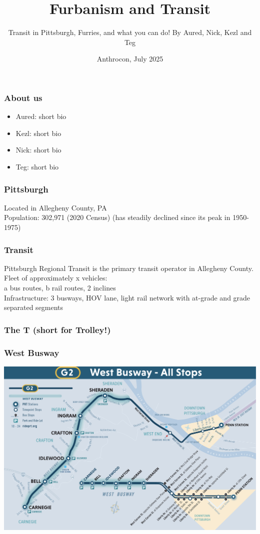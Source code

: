 \documentclass{beamer}
\title{Furbanism and Transit}
\subtitle{Transit in Pittsburgh, Furries, and what you can do! By Aured, Nick, Kezl and Teg}
\date[Anthrocon 2025]{Anthrocon, July 2025}
\begin{document}
\frame{\titlepage}

\begin{frame}
\frametitle{About us}
\begin{itemize}
    \item Aured: short bio %
    \item Kezl: short bio %
    \item Nick: short bio %
    \item Teg: short bio %
\end{itemize}
\end{frame}

\begin{frame}
\frametitle{Pittsburgh}
Located in Allegheny County, PA \\
Population: 302,971 (2020 Census) (has steadily declined since its peak in 1950-1975) \\
\end{frame}

\begin{frame}
\frametitle{Transit}
Pittsburgh Regional Transit is the primary transit operator in Allegheny County. \\
Fleet of approximately x vehicles: \\
a bus routes, b rail routes, 2 inclines \\
Infrastructure: 3 busways, HOV lane, light rail network with at-grade and grade separated segments
\end{frame}

\begin{frame}
\frametitle{The T (short for Trolley!)}
\end{frame}

\begin{frame}
\frametitle{West Busway}
\includegraphics[width=\textwidth]{img/westbusway.png}
\end{frame}
\end{document}
